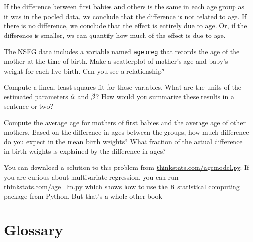 \documentclass[12pt]{book}
\begin{document}

If the difference between first babies and others is the same in
each age group as it was in the pooled data, we conclude
that the difference is not related to age.  If there is no difference,
we conclude that the effect is entirely due to age.  Or,
if the difference is smaller, we can quantify how much of the effect
is due to age.

\begin{exercise}
The NSFG data includes a variable named {\tt agepreg} that records
the age of the mother at the time of birth.
Make a scatterplot of mother's age and baby's weight for each live
birth.  Can you see a relationship?

Compute a linear least-squares fit for these variables.  What are the
units of the estimated parameters $\hat{\alpha}$ and $\hat{\beta}$?
How would you summarize these results in a sentence or two?

Compute the average age for mothers of first babies and the average
age of other mothers.  Based on the difference in ages between the
groups, how much difference do you expect in the mean birth weights?
What fraction of the actual difference in birth weights is explained
by the difference in ages?

You can download a solution to this problem from
\url{thinkstats.com/agemodel.py}.  If you are curious about
multivariate regression, you can run \url{thinkstats.com/age_lm.py}
which shows how to use the R statistical computing package from
Python.  But that's a whole other book.


\end{exercise}


\section{Glossary}
\end{document}
